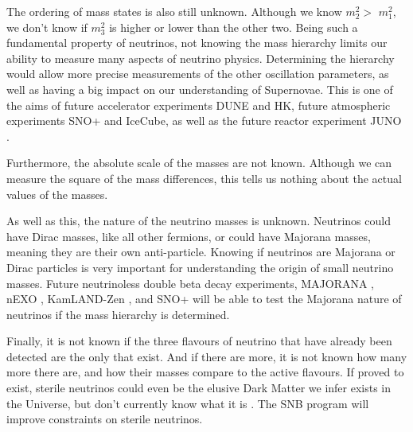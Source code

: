 The ordering of mass states is also still unknown. Although we know $m_{2}^2 >$ $m_{1}^2$, we don't know if $m_3^2$ is higher or lower than the other two. Being such a fundamental property of neutrinos, not knowing the mass hierarchy limits our ability to measure many aspects of neutrino physics. Determining the hierarchy would allow more precise measurements of the other oscillation parameters, as well as having a big impact on our understanding of Supernovae. This is one of the aims of future accelerator experiments DUNE and HK, future atmospheric experiments SNO+ and IceCube, as well as the future reactor experiment JUNO \cite{juno}.

Furthermore, the absolute scale of the masses are not known. Although we can measure the square of the mass differences, this tells us nothing about the actual values of the masses.

As well as this, the nature of the neutrino masses is unknown. Neutrinos could have Dirac masses, like all other fermions, or could have Majorana masses, meaning they are their own anti-particle. Knowing if neutrinos are Majorana or Dirac particles is very important for understanding the origin of small neutrino masses. Future neutrinoless double beta decay experiments, MAJORANA \cite{2011majorana}, nEXO \cite{nexo}, KamLAND-Zen \cite{kamlandzen}, and SNO+ will be able to test the Majorana nature of neutrinos if the mass hierarchy is determined.

Finally, it is not known if the three flavours of neutrino that have already been detected are the only that exist. And if there are more, it is not known how many more there are, and how their masses compare to the active flavours. If proved to exist, sterile neutrinos could even be the elusive Dark Matter we infer exists in the Universe, but don't currently know what it is \cite{darkmatter}. The SNB program will improve constraints on sterile neutrinos.

\newpage